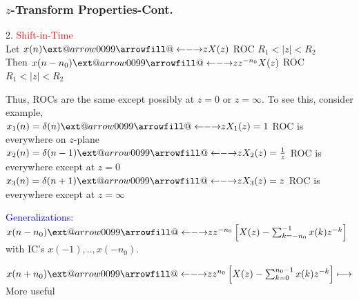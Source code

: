\documentclass[mathserif, 10pt]{beamer} %
\makeatletter
\newcommand\xleftrightarrow[2][]{\ext@arrow 0099{\longleftrightarrowfill@}{#1}{#2}}
\def\longleftrightarrowfill@{\arrowfill@\leftarrow\relbar\rightarrow}
\makeatother
\begin{document}
\frame
{
\frametitle{$z$-Transform Properties-Cont.}

2.  \textcolor{red}{Shift-in-Time}\\ \vspace{.1in}
Let $x(n) \xleftrightarrow[]{z} X(z) $  \hspace{0.2in} ROC  $R_1<|z|<R_2$\\ \vspace{.1in}
Then $x(n-n_0) \xleftrightarrow[]{z} z^{-n_0}X(z)$ \hspace{0.2in}  ROC  $R_1<|z|<R_2$ \\ \vspace{.1in}

Thus, ROCs are the same except possibly at $z=0$ or $z=\infty$. To see this, consider example, \\

$x_1(n) = \delta (n) \xleftrightarrow[]{z} X_1(z) = 1$ \hspace{0.2in} ROC is everywhere on $z$-plane \\
$x_2(n) = \delta(n-1) \xleftrightarrow[]{z} X_2(z) = \frac{1}{z}$ \hspace{0.2in} ROC is everywhere except at $z=0$ \\
$x_3(n) = \delta(n+1) \xleftrightarrow[]{z} X_3(z) = z$ \hspace{0.2in} ROC is everywhere except at $z = \infty$ \\ \vspace{.1in}


\textcolor{blue}{Generalizations:}\\ \vspace{.1in}
$x(n-n_0) \xleftrightarrow[]{z} z^{-n_0} \left [X(z) - \sum_{k=-n_0}^{-1}x(k)z^{-k} \right ]$ with IC's $x(-1),..,x(-n_0)$. \\ \vspace{.1in}

$x(n+n_0) \xleftrightarrow[]{z} z^{n_0} \left [X(z) - \sum_{k=0}^{n_0-1}x(k)z^{-k} \right ]\longmapsto$ More useful

}
\end{document}
